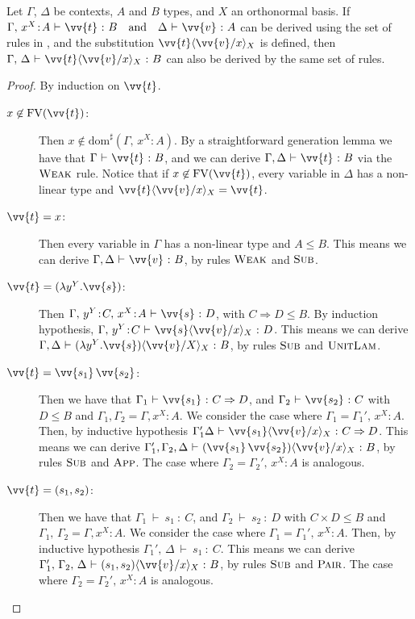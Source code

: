 \documentclass[runningheads,orivec,envcountsame,envcountsect]{llncs}
\newcommand\ansubst[2]{\ensuremath{\langle #1 \rangle_{#2}}}
\newcommand\sdom[1]{\mathrm{dom}^{\sharp}(#1)}
\newcommand\FV[1]{\mathrm{FV}(#1)}
\def\Pair#1#2{(#1,#2)} %
\def\Lam#1#2#3{\lambda#1^{#2}{.}#3} %
\def\Arr{\Rightarrow}
\def\TYP#1#2#3{#1~{\vdash}~#2~{:}~#3}
\begin{document}
\begin{lemma}[Substitution]\label{lem:Substitution}
  Let $\Gamma$, $\Delta$ be contexts, $A$ and $B$ types, and $X$ an orthonormal basis.
  If
  \(
    \TYP{\Gamma,\,x^{X}\!:\!A}{\vv{t}}{B}
    \quad\text{and}\quad
    \TYP{\Delta}{\vv{v}}{A}
  \) can be derived using the set of rules in ,
  and the substitution $\vv{t}\ansubst{\vv{v}/x}{X}$ is defined,
  then
  \(
    \TYP{\Gamma,\,\Delta}{\vv{t}\ansubst{\vv{v}/x}{X}}{B}
  \) can also be derived by the same set of rules.
\end{lemma}
\begin{proof}
  By induction on $\vv{t}$.
  \begin{description}
    \item[$x\not\in\FV{\vv{t}}$:] Then $x\not\in\sdom{\Gamma,\,x^{X}\!:\!A}$. By a straightforward generation lemma we have that $\TYP{\Gamma}{\vv{t}}{B}$, and we can derive $\TYP{\Gamma,\Delta}{\vv{t}}{B}$ via the $\textsc{Weak}$ rule. Notice that if $x\not\in\FV{\vv{t}}$, every variable in $\Delta$ has a non-linear type and $\vv{t}\ansubst{\vv{v}/x}{X}=\vv{t}$.
    
    \item[$\vv{t}=x$:] Then every variable in $\Gamma$ has a non-linear type and $A\leq B$. This means we can derive $\TYP{\Gamma,\Delta}{\vv{v}}{B}$, by rules $\textsc{Weak}$ and $\textsc{Sub}$.
    
    \item[$\vv{t}=(\Lam{y}{Y}{\vv{s}})$:] Then $\TYP{\Gamma,\,y^{Y}\!:\!C,\,x^{X}\!:\!A}{\vv{s}}{D}$, with $C\Arr D\leq B$. By induction hypothesis, $\TYP{\Gamma,\,y^{Y}\!:\!C}{\vv{s}\ansubst{\vv{v}/x}{X}}{D}$. This means we can derive $\TYP{\Gamma,\Delta}{(\Lam{y}{Y}{\vv{s}})\ansubst{\vv{v}/X}{X}}{B}$, by rules $\textsc{Sub}$ and $\textsc{UnitLam}$.
    
    \item[$\vv{t}=\vv{s_1}\,\vv{s_2}$:] Then we have that $\TYP{\Gamma_1}{\vv{s_1}}{C\Arr D}$, and $\TYP{\Gamma_2}{\vv{s_2}}{C}$ with $D\leq B$ and $\Gamma_1,\Gamma_2 = \Gamma,x^{X}\!:\!A$. We consider the case where $\Gamma_1 = \Gamma_1',\,x^{X}\!:\!A$. Then, by inductive hypothesis $\TYP{\Gamma_1'\Delta}{\vv{s_1}\ansubst{\vv{v}/x}{X}}{C\Arr D}$. This means we can derive $\TYP{\Gamma_1',\Gamma_2,\Delta}{(\vv{s_1}\,\vv{s_2})\ansubst{\vv{v}/x}{X}}{B}$, by rules $\textsc{Sub}$ and $\textsc{App}$. The case where $\Gamma_2 = \Gamma_2',\,x^{X}\!:\!A$ is analogous.
    
    \item[$\vv{t}=\Pair{s_1}{s_2}$:] Then we have that $\TYP{\Gamma_1}{s_1}{C}$, and $\TYP{\Gamma_2}{s_2}{D}$ with $C\times D\leq B$ and $\Gamma_1,\,\Gamma_2 = \Gamma,x^{X}\!:\!A$. We consider the case where $\Gamma_1 = \Gamma_1',\,x^{X}\!:\!A$. Then, by inductive hypothesis $\TYP{\Gamma_1',\,\Delta}{s_1}{C}$. This means we can derive $\TYP{\Gamma_1',\,\Gamma_2,\,\Delta}{\Pair{s_1}{s_2}\ansubst{\vv{v}/x}{X}}{B}$, by rules $\textsc{Sub}$ and $\textsc{Pair}$. The case where $\Gamma_2 = \Gamma_2',\,x^{X}\!:\!A$ is analogous.
    

\end{description}
\end{proof}
\end{document}

